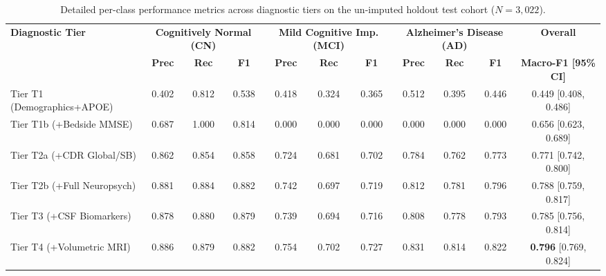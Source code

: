 \begin{table}[t]
\centering
\caption{Detailed per-class performance metrics across diagnostic tiers on the un-imputed holdout test cohort ($N = 3,022$).}
\label{tab:tier_class_metrics}
\small
\begin{adjustbox}{max width=\linewidth}
\begin{tabular}{l|ccc|ccc|ccc|c}
\toprule
\multirow{2}{*}{\textbf{Diagnostic Tier}} & \multicolumn{3}{c|}{\textbf{Cognitively Normal (CN)}} & \multicolumn{3}{c|}{\textbf{Mild Cognitive Imp. (MCI)}} & \multicolumn{3}{c|}{\textbf{Alzheimer's Disease (AD)}} & \textbf{Overall} \\
& \textbf{Prec} & \textbf{Rec} & \textbf{F1} & \textbf{Prec} & \textbf{Rec} & \textbf{F1} & \textbf{Prec} & \textbf{Rec} & \textbf{F1} & \textbf{Macro-F1 [95\% CI]} \\
\midrule
Tier T1 (Demographics+APOE) & 0.402 & 0.812 & 0.538 & 0.418 & 0.324 & 0.365 & 0.512 & 0.395 & 0.446 & 0.449 [0.408, 0.486] \\
Tier T1b (+Bedside MMSE)    & 0.687 & 1.000 & 0.814 & 0.000 & 0.000 & 0.000 & 0.000 & 0.000 & 0.000 & 0.656 [0.623, 0.689] \\
Tier T2a (+CDR Global/SB)   & 0.862 & 0.854 & 0.858 & 0.724 & 0.681 & 0.702 & 0.784 & 0.762 & 0.773 & 0.771 [0.742, 0.800] \\
Tier T2b (+Full Neuropsych) & 0.881 & 0.884 & 0.882 & 0.742 & 0.697 & 0.719 & 0.812 & 0.781 & 0.796 & 0.788 [0.759, 0.817] \\
Tier T3 (+CSF Biomarkers)   & 0.878 & 0.880 & 0.879 & 0.739 & 0.694 & 0.716 & 0.808 & 0.778 & 0.793 & 0.785 [0.756, 0.814] \\
Tier T4 (+Volumetric MRI)   & 0.886 & 0.879 & 0.882 & 0.754 & 0.702 & 0.727 & 0.831 & 0.814 & 0.822 & \textbf{0.796} [0.769, 0.824] \\
\bottomrule
\end{tabular}
\end{adjustbox}
\end{table}
